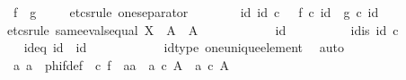 \begin{isabellebody}
\ {\isachardoublequoteopen}f\ {\isacharequal}{\kern0pt}\ g{\isachardoublequoteclose}\isanewline
\ \ \ \ \isamarkupfalse%
{\isacharparenleft}{\kern0pt}etcs{\isacharunderscore}{\kern0pt}rule\ one{\isacharunderscore}{\kern0pt}separator{\isacharparenright}{\kern0pt}\isanewline
\ \ \ \ \ \ \isamarkupfalse%
\ {\isachardoublequoteopen}{\isasymAnd}id{\isacharunderscore}{\kern0pt}{}{\isachardot}{\kern0pt}\ id{\isacharunderscore}{\kern0pt}{}\ {\isasymin}\isactrlsub c\ {\isasymone}\ {\isasymLongrightarrow}\ f\ {\isasymcirc}\isactrlsub c\ id{\isacharunderscore}{\kern0pt}{}\ {\isacharequal}{\kern0pt}\ g\ {\isasymcirc}\isactrlsub c\ id{\isacharunderscore}{\kern0pt}{}{\isachardoublequoteclose}\isanewline
\ \ \ \ \ \ \isamarkupfalse%
{\isacharparenleft}{\kern0pt}etcs{\isacharunderscore}{\kern0pt}rule\ same{\isacharunderscore}{\kern0pt}evals{\isacharunderscore}{\kern0pt}equal{\isacharbrackleft}{\kern0pt}\ X\ {\isacharequal}{\kern0pt}\ A{\isacharcomma}{\kern0pt}\ \ A\ {\isacharequal}{\kern0pt}\ {\isasymOmega}{\isacharbrackright}{\kern0pt}{\isacharparenright}{\kern0pt}\isanewline
\ \ \ \ \ \ \ \ \isamarkupfalse%
\ id{\isacharunderscore}{\kern0pt}{}\isanewline
\ \ \ \ \ \ \ \ \isamarkupfalse%
\ id{}{\isacharunderscore}{\kern0pt}is{\isacharcolon}{\kern0pt}\ {\isachardoublequoteopen}id{\isacharunderscore}{\kern0pt}{}\ {\isasymin}\isactrlsub c\ {\isasymone}{\isachardoublequoteclose}\isanewline
\ \ \ \ \ \ \ \ \isamarkupfalse%
\ \isamarkupfalse%
\ id{}{\isacharunderscore}{\kern0pt}eq{\isacharcolon}{\kern0pt}\ {\isachardoublequoteopen}id{\isacharunderscore}{\kern0pt}{}\ {\isacharequal}{\kern0pt}\ id{\isacharparenleft}{\kern0pt}{\isasymone}{\isacharparenright}{\kern0pt}{\isachardoublequoteclose}\isanewline
\ \ \ \ \ \ \ \ \ \ \isamarkupfalse%
\ id{\isacharunderscore}{\kern0pt}type\ one{\isacharunderscore}{\kern0pt}unique{\isacharunderscore}{\kern0pt}element\ \isamarkupfalse%
\ auto\isanewline
\isanewline
\ \ \ \ \ \ \ \ \isamarkupfalse%
\ a{}\ a{}\ \ phi{\isacharunderscore}{\kern0pt}f{\isacharunderscore}{\kern0pt}def{\isacharcolon}{\kern0pt}\ {\isachardoublequoteopen}{\isasymphi}\ {\isasymcirc}\isactrlsub c\ f\ {\isacharequal}{\kern0pt}\ {\isasymlangle}a{}{\isacharcomma}{\kern0pt}a{}{\isasymrangle}\ {\isasymand}\ a{}\ {\isasymin}\isactrlsub c\ A\ {\isasymand}\ a{}\ {\isasymin}\isactrlsub c\ A{\isachardoublequoteclose}\isanewline

\end{isabellebody}
